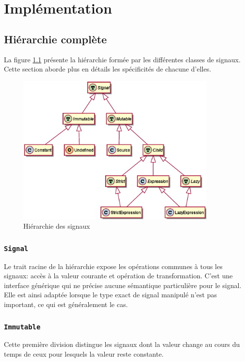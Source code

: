 \section{Implémentation}

\subsection{Hiérarchie complète}
\label{sec:sig-hierarchy}

La figure \ref{sec:sig-hierarchy} présente la hiérarchie formée par les différentes classes de signaux. Cette section aborde plus en détails les spécificités de chacune d'elles.

\begin{figure}[h]
	\centering
	\includegraphics[width=10cm]{img/sig_hierarchy.eps}
	\caption{Hiérarchie des signaux}
	\label{fig:sig-hierarchy}
\end{figure}

\subsubsection{\texttt{Signal}}

Le trait racine de la hiérarchie expose les opérations communes à tous les signaux: accès à la valeur courante et opération de transformation. C'est une interface générique qui ne précise aucune sémantique particulière pour le signal. Elle est ainsi adaptée lorsque le type exact de signal manipulé n'est pas important, ce qui est généralement le cas.

\subsubsection{\texttt{Immutable}}

Cette première division distingue les signaux dont la valeur change au cours du temps de ceux pour lesquels la valeur reste constante.


